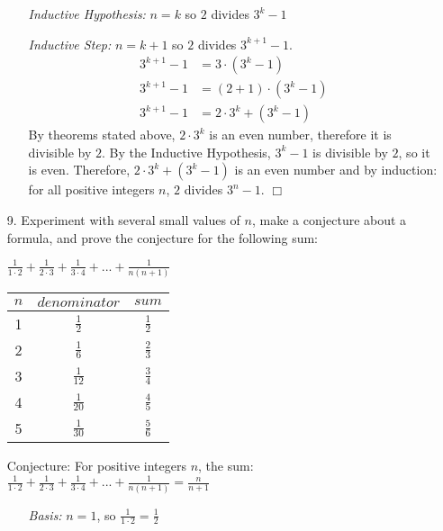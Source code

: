 \documentclass{article}
\begin{document}
\begin{itemize}
\begin{itemize}
        \item[]\emph{Inductive Hypothesis:} $n=k$ so $2$ divides $3^k-1$
        
        \item[]\emph{Inductive Step:} $n=k+1$ so $2$ divides $3^{k+1}-1$.
        \begin{align}
            3^{k+1}-1&=3\cdot(3^{k}-1)\nonumber\\
            3^{k+1}-1&=(2+1)\cdot(3^{k}-1)\nonumber\\
            3^{k+1}-1&=2\cdot3^k+(3^k-1)\nonumber
        \end{align}
        By theorems stated above, $2\cdot3^k$ is an even number, therefore it is divisible by $2$.  By the Inductive Hypothesis, $3^k-1$ is divisible by $2$, so it is even.  Therefore, $2\cdot3^k+(3^k-1)$ is an even number and by induction: for all positive integers $n$, $2$ divides $3^n-1$. $\Box$
    \end{itemize}
    
    \item[9.] Experiment with several small values of $n$, make a conjecture about a formula, and prove the conjecture for the following sum:
    \begin{center}
        $\frac{1}{1\cdot2}+\frac{1}{2\cdot3}+\frac{1}{3\cdot4}+...+\frac{1}{n(n+1)}$
        
    \renewcommand{\arraystretch}{1.4}
    \begin{tabular}{|c|c|c|}
    
        \hline
        $n$ & $denominator$ & $sum$ \\
        \hline
        1 & $\frac{1}{2}$ & $\frac{1}{2}$\\
        \hline
        2 & $\frac{1}{6}$ & $\frac{2}{3}$\\
        \hline
        3 & $\frac{1}{12}$ & $\frac{3}{4}$\\
        \hline
        4 & $\frac{1}{20}$ & $\frac{4}{5}$\\
        \hline
        5 & $\frac{1}{30}$ & $\frac{5}{6}$\\
        \hline
    \end{tabular}
    \end{center}
    
    Conjecture: For positive integers $n$, the sum: $\frac{1}{1\cdot2}+\frac{1}{2\cdot3}+\frac{1}{3\cdot4}+...+\frac{1}{n(n+1)}=\frac{n}{n+1}$
    \begin{itemize}
        \item[]\emph{Basis:} $n=1$, so $\frac{1}{1\cdot2}=\frac{1}{2}$
        

\end{itemize}
\end{itemize}
\end{document}
